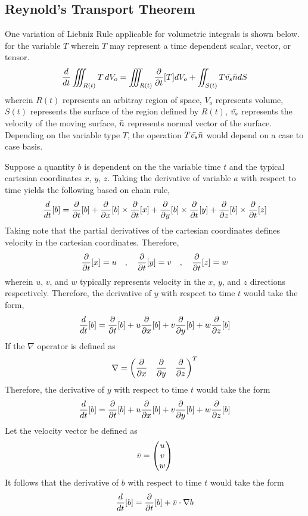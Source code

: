 \documentclass[class=report, 12pt, crop=false]{standalone}
\begin{document}
\begin{center}
\chapter{Reynold's Transport Theorem}
\begin{comment}
Liebnitz Theorem
\end{comment}
One variation of Liebniz Rule applicable for volumetric integrals is shown below. for the variable $T$ wherein $T$ may represent a time dependent scalar, vector, or tensor.
$$\frac{d}{dt}\iiint_{R(t)}T\,dV_o = \iiint_{R(t)}\frac{\partial}{\partial t}[T]dV_o + \iint_{S(t)}T\bar{v_s}\bar{n}dS$$
wherein $R(t)$ represents an arbitray region of space, $V_o$ represents volume, $S(t)$ represents the surface of the region defined by $R(t)$, $\bar{v_s}$ represents the velocity of the moving surface, $\bar{n}$ represents normal vector of the surface. Depending on the variable type $T$, the operation $\displaystyle{T\bar{v_s}\bar{n}}$ would depend on a case to case basis.
\begin{comment}
Substantive Derivative
\end{comment}
Suppose a quantity $b$ is dependent on the the variable time $t$ and the typical cartesian coordinates $x$, $y$, $z$. Taking the derivative of variable $a$ with respect to time yields the following based on chain rule,
$$\frac{d}{dt}[b] = \frac{\partial}{\partial t}[b] + \frac{\partial}{\partial x}[b]\times\frac{\partial}{\partial t}[x] + \frac{\partial}{\partial y}[b]\times\frac{\partial}{\partial t}[y] + \frac{\partial}{\partial z}[b]\times\frac{\partial}{\partial t}[z]$$
Taking note that the partial derivatives of the cartesian coordinates defines velocity in the cartesian coordinates. Therefore, 
$$\frac{\partial}{\partial t}[x] = u\quad,\quad \frac{\partial}{\partial t}[y] = v\quad,\quad \frac{\partial}{\partial t}[z] = w$$
wherein $u$, $v$, and $w$ typically represents velocity in the $x$, $y$, and $z$ directions respectively. Therefore, the derivative of $y$ with respect to time $t$ would take the form,
$$\frac{d}{dt}[b] = \frac{\partial}{\partial t}[b] + u\frac{\partial}{\partial x}[b] + v\frac{\partial}{\partial y}[b] + w\frac{\partial}{\partial z}[b]$$
If the $\nabla$ operator is defined as
$$\nabla = \begin{pmatrix} \displaystyle{\frac{\partial}{\partial x}}& \displaystyle{\frac{\partial}{\partial y}}& \displaystyle{\frac{\partial}{\partial z}} \end{pmatrix}^T$$
Therefore, the derivative of $y$ with respect to time $t$ would take the form
$$\frac{d}{dt}[b] = \frac{\partial}{\partial t}[b] + u\frac{\partial}{\partial x}[b] + v\frac{\partial}{\partial y}[b] + w\frac{\partial}{\partial z}[b]$$
Let the velocity vector be defined as 
$$\bar{v} = \begin{pmatrix}u\\v\\w\\ \end{pmatrix}$$
It follows that the derivative of $b$ with respect to time $t$ would take the form
$$\frac{d}{dt}[b] = \frac{\partial}{\partial t}[b] + \bar{v}\cdot\nabla b$$

\end{center}
\end{document}
